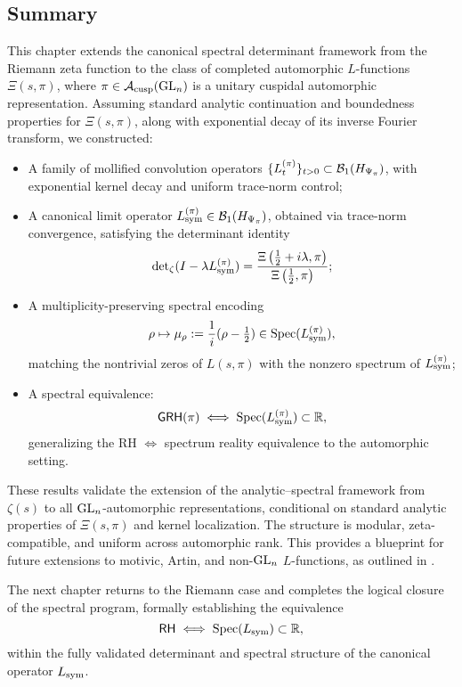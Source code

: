 \subsection*{Summary}

This chapter extends the canonical spectral determinant framework from the Riemann zeta function to the class of completed automorphic \( L \)-functions \( \Xi(s, \pi) \), where \( \pi \in \mathcal{A}_{\mathrm{cusp}}(\mathrm{GL}_n) \) is a unitary cuspidal automorphic representation. Assuming standard analytic continuation and boundedness properties for \( \Xi(s, \pi) \), along with exponential decay of its inverse Fourier transform, we constructed:

\begin{itemize}
  \item A family of mollified convolution operators \( \{ L_t^{(\pi)} \}_{t > 0} \subset \mathcal{B}_1(H_{\Psi_{\pi}}) \), with exponential kernel decay and uniform trace-norm control;

  \item A canonical limit operator \( L_{\mathrm{sym}}^{(\pi)} \in \mathcal{B}_1(H_{\Psi_{\pi}}) \), obtained via trace-norm convergence, satisfying the determinant identity
  \[
  \det\nolimits_{\zeta}(I - \lambda L_{\mathrm{sym}}^{(\pi)}) = \frac{\Xi\left(\tfrac{1}{2} + i\lambda, \pi\right)}{\Xi\left(\tfrac{1}{2}, \pi\right)};
  \]

  \item A multiplicity-preserving spectral encoding
  \[
  \rho \mapsto \mu_\rho := \frac{1}{i}(\rho - \tfrac{1}{2}) \in \operatorname{Spec}(L_{\mathrm{sym}}^{(\pi)}),
  \]
  matching the nontrivial zeros of \( L(s, \pi) \) with the nonzero spectrum of \( L_{\mathrm{sym}}^{(\pi)} \);

  \item A spectral equivalence:
  \[
  \mathsf{GRH}(\pi) \iff \operatorname{Spec}(L_{\mathrm{sym}}^{(\pi)}) \subset \mathbb{R},
  \]
  generalizing the RH \( \iff \) spectrum reality equivalence to the automorphic setting.
\end{itemize}

\medskip

These results validate the extension of the analytic–spectral framework from \( \zeta(s) \) to all \( \mathrm{GL}_n \)-automorphic representations, conditional on standard analytic properties of \( \Xi(s, \pi) \) and kernel localization. The structure is modular, zeta-compatible, and uniform across automorphic rank. This provides a blueprint for future extensions to motivic, Artin, and non-\( \mathrm{GL}_n \) \( L \)-functions, as outlined in .

\medskip

The next chapter returns to the Riemann case and completes the logical closure of the spectral program, formally establishing the equivalence
\[
\mathsf{RH} \iff \operatorname{Spec}(L_{\mathrm{sym}}) \subset \mathbb{R},
\]
within the fully validated determinant and spectral structure of the canonical operator \( L_{\mathrm{sym}} \).
